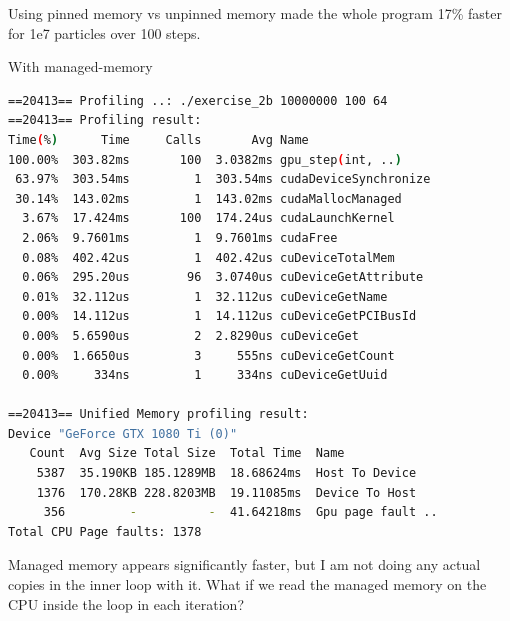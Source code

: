 \documentclass{article}
\begin{document}
Using pinned memory vs unpinned memory made the whole program 17\% faster for 1e7 particles over 100 steps.


\newpage

With managed-memory
\begin{mdframed}[backgroundcolor=codeColor,leftmargin=0.0cm,hidealllines=true,%
  innerleftmargin=0.1cm,innerrightmargin=0.1cm,innertopmargin=0.5cm,innerbottommargin=0.10cm,
  roundcorner=15pt]
\begin{lstlisting}[language=bash]
==20413== Profiling ..: ./exercise_2b 10000000 100 64
==20413== Profiling result:
Time(%)      Time     Calls       Avg Name
100.00%  303.82ms       100  3.0382ms gpu_step(int, ..)
 63.97%  303.54ms         1  303.54ms cudaDeviceSynchronize
 30.14%  143.02ms         1  143.02ms cudaMallocManaged
  3.67%  17.424ms       100  174.24us cudaLaunchKernel
  2.06%  9.7601ms         1  9.7601ms cudaFree
  0.08%  402.42us         1  402.42us cuDeviceTotalMem
  0.06%  295.20us        96  3.0740us cuDeviceGetAttribute
  0.01%  32.112us         1  32.112us cuDeviceGetName
  0.00%  14.112us         1  14.112us cuDeviceGetPCIBusId
  0.00%  5.6590us         2  2.8290us cuDeviceGet
  0.00%  1.6650us         3     555ns cuDeviceGetCount
  0.00%     334ns         1     334ns cuDeviceGetUuid

==20413== Unified Memory profiling result:
Device "GeForce GTX 1080 Ti (0)"
   Count  Avg Size Total Size  Total Time  Name
    5387  35.190KB 185.1289MB  18.68624ms  Host To Device
    1376  170.28KB 228.8203MB  19.11085ms  Device To Host
     356         -          -  41.64218ms  Gpu page fault ..
Total CPU Page faults: 1378
\end{lstlisting}
\end{mdframed}

Managed memory appears significantly faster, but I am not doing any actual copies in the inner loop with it. What if we read the managed memory on the CPU inside the loop in each iteration?

\newpage
\end{document}

